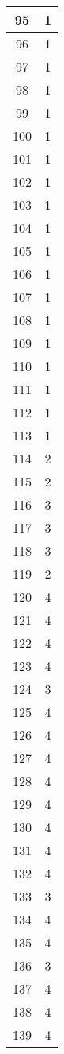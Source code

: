 \documentclass[letterpaper, 12pt]{article}
\begin{document}
\begin{longtable}{|c|c|}
\hline
95 & 1 \\
\hline
96 & 1 \\
\hline
97 & 1 \\
\hline
98 & 1 \\
\hline
99 & 1 \\
\hline
100 & 1 \\
\hline
101 & 1 \\
\hline
102 & 1 \\
\hline
103 & 1 \\
\hline
104 & 1 \\
\hline
105 & 1 \\
\hline
106 & 1 \\
\hline
107 & 1 \\
\hline
108 & 1 \\
\hline
109 & 1 \\
\hline
110 & 1 \\
\hline
111 & 1 \\
\hline
112 & 1 \\
\hline
113 & 1 \\
\hline
114 & 2 \\
\hline
115 & 2 \\
\hline
116 & 3 \\
\hline
117 & 3 \\
\hline
118 & 3 \\
\hline
119 & 2 \\
\hline
120 & 4 \\
\hline
121 & 4 \\
\hline
122 & 4 \\
\hline
123 & 4 \\
\hline
124 & 3 \\
\hline
125 & 4 \\
\hline
126 & 4 \\
\hline
127 & 4 \\
\hline
128 & 4 \\
\hline
129 & 4 \\
\hline
130 & 4 \\
\hline
131 & 4 \\
\hline
132 & 4 \\
\hline
133 & 3 \\
\hline
134 & 4 \\
\hline
135 & 4 \\
\hline
136 & 3 \\
\hline
137 & 4 \\
\hline
138 & 4 \\
\hline
139 & 4 \\

\end{longtable}
\end{document}
